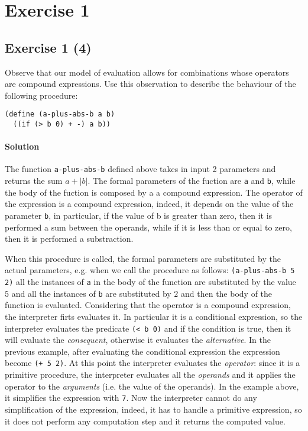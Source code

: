 \section*{Exercise 1}

\subsection*{Exercise 1 (4)}
Observe that our model of evaluation allows for combinations whose operators are compound expressions. Use this observation to 
describe the behaviour of the following procedure:

\begin{lstlisting}
(define (a-plus-abs-b a b) 
  ((if (> b 0) + -) a b))
\end{lstlisting}

\paragraph{Solution}
The function \texttt{a-plus-abs-b} defined above takes in input 2 parameters and returns the sum $ a + |b| $. 
The formal parameters of the fuction are \texttt{a} and \texttt{b}, while the body of the fuction is composed by a 
a compound expression. The operator of the expression is a compound expression, indeed, it depends on the value of the
parameter \texttt{b}, in particular, if the value of {b} is greater than zero, then it is performed a sum between the 
operands, while if it is less than or equal to zero, then it is performed a substraction.

When this procedure is called, the formal parameters are substituted by the actual parameters, e.g. when we call the procedure as
follows: \texttt{(a-plus-abs-b 5 2)} all the instances of \texttt{a} in the body of the function are substituted by the value
$ 5 $ and all the instances of \texttt{b} are substituted by $ 2 $ and then the body of the function is evaluated.
Considering that the operator is a compound expression, the interpreter firts evaluates it. 
In particular it is a conditional  expression, so the interpreter evaluates the predicate \texttt{(< b 0)} 
and if the condition is true, then it will evaluate the \textit{consequent}, otherwise it evaluates the \textit{alternative}.
In the previous example, after evaluating the conditional expression the expression become \texttt{(+ 5 2)}.
At this point the interpreter evaluates the \textit{operator}: since it is a primitive procedure, the interpreter evaluates all the 
\textit{operands} and it applies the operator to the \textit{arguments} (i.e. the value of the operands).
In the example above, it simplifies the expression with \texttt{7}.
Now the interpreter cannot do any simplification of the expression, indeed, it has to handle a primitive expression, so 
it does not perform any computation step and it returns the computed value.


